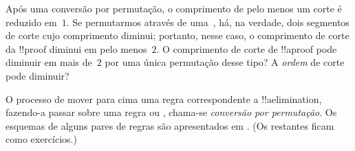 \documentclass[../../../include/open-logic-section]{subfiles}
\begin{document}
\begin{prob}
Após uma conversão por permutação, o comprimento de pelo menos um corte é
reduzido em~$1$. Se permutarmos \Elim{\land} através de uma~\Elim{\lor},
há, na verdade, dois segmentos de corte cujo comprimento diminui; portanto,
nesse caso, o comprimento de corte da !!{proof} diminui em pelo
menos~$2$. O comprimento de corte de !!a{proof} pode diminuir em mais de~$2$
por uma única permutação desse tipo? A \emph{ordem} de corte pode diminuir?
\end{prob}

O processo de mover para cima uma regra correspondente a !!a{elimination},
fazendo-a passar sobre uma regra \Elim{\lor} ou \Elim{\lexists}, chama-se
\emph{conversão por permutação}. Os
esquemas de alguns pares de regras são apresentados em
. (Os restantes ficam como
exercícios.) 
\end{document}
